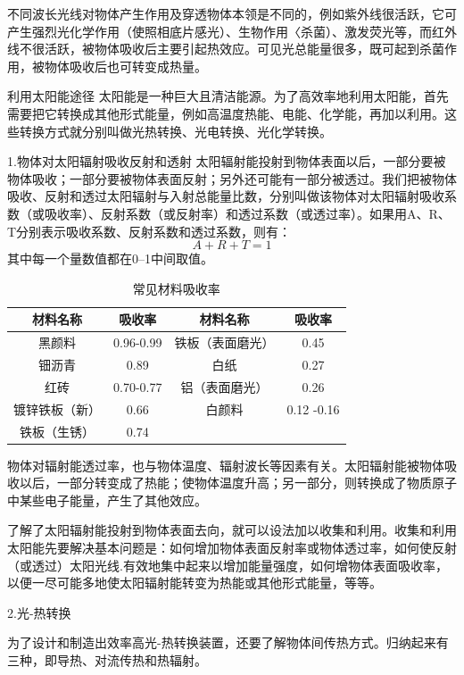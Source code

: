 \documentclass{ctexbook}
\begin{document}
不同波长光线对物体产生作用及穿透物体本领是不同的，例如紫外线很活跃，它可产生强烈光化学作用（使照相底片感光）、生物作用〈杀菌）、激发荧光等，而红外线不很活跃，被物体吸收后主要引起热效应。可见光总能量很多，既可起到杀菌作用，被物体吸收后也可转变成热量。

利用太阳能途径
太阳能是一种巨大且清洁能源。为了高效率地利用太阳能，首先需要把它转换成其他形式能量，例如高温度热能、电能、化学能，再加以利用。这些转换方式就分别叫做光热转换、光电转换、光化学转换。

1.物体对太阳辐射吸收反射和透射
太阳辐射能投射到物体表面以后，一部分要被物体吸收；一部分要被物体表面反射；另外还可能有一部分被透过。我们把被物体吸收、反射和透过太阳辐射与入射总能量比数，分别叫做该物体对太阳辐射吸收系数（或吸收率）、反射系数（或反射率）和透过系数（或透过率）。如果用A、R、T分别表示吸收系数、反射系数和透过系数，则有：
\begin{equation*}
	A+R+T=1
\end{equation*}
其中每一个量数值都在0--1中间取值。
\begin{table}[htbp]
	\centering
	\caption{常见材料吸收率}
	\begin{tabular}{c|c|c|c}
		\toprule
		材料名称  & 吸收率   & 材料名称  & 吸收率 \\
		\midrule
		黑颜料   & 0.96-0.99 & 铁板（表面磨光） & 0.45 \\
		\midrule
		钿沥青   & 0.89  & 白纸    & 0.27 \\
		\midrule
		红砖    & 0.70-0.77 & 铝（表面磨光） & 0.26 \\
		\midrule
		镀锌铁板（新） & 0.66  & 白颜料   & 0.12 -0.16 \\
		\midrule
		铁板（生锈） & 0.74  &       &  \\
		\bottomrule
	\end{tabular}%
	\label{tab:xishou}%
\end{table}%
物体对辐射能透过率，也与物体温度、辐射波长等因素有关。太阳辐射能被物体吸收以后，一部分转变成了热能；使物体温度升高；另一部分，则转换成了物质原子中某些电子能量，产生了其他效应。

了解了太阳辐射能投射到物体表面去向，就可以设法加以收集和利用。收集和利用太阳能先要解决基本问题是：如何增加物体表面反射率或物体透过率，如何使反射（或透过）太阳光线.有效地集中起来以增加能量强度，如何增物体表面吸收率，以便一尽可能多地使太阳辐射能转变为热能或其他形式能量，等等。

2.光-热转换

为了设计和制造出效率高光-热转换装置，还要了解物体间传热方式。归纳起来有三种，即导热、对流传热和热辐射。
\end{document}
